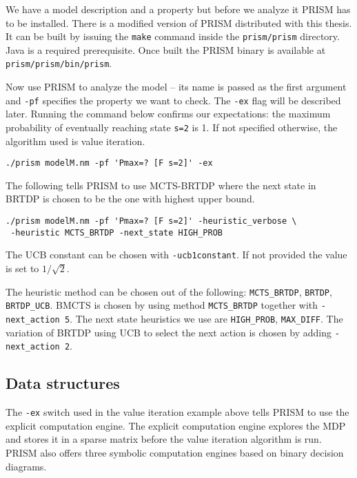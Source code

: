 We have a model description and a property but before we analyze it
PRISM has to be installed.
There is a modified version of PRISM distributed with this thesis. It
can be built by issuing the \verb|make| command inside the
\verb|prism/prism| directory. Java is a required prerequisite.
Once built the PRISM binary is available at \verb|prism/prism/bin/prism|.

Now use PRISM to analyze the model -- its name is passed as the first
argument and \verb|-pf| specifies the property we want to check.
The \verb|-ex| flag will be described later.
Running the command below
confirms our expectations: the maximum probability of eventually
reaching state \verb|s=2| is 1. If not specified otherwise, the
algorithm used is value iteration.

\medskip
\begin{verbatim}
./prism modelM.nm -pf 'Pmax=? [F s=2]' -ex
\end{verbatim}
\medskip

The following tells PRISM to use MCTS-BRTDP where the next state in
BRTDP is chosen to be the one with highest upper bound.

\medskip
\begin{verbatim}
./prism modelM.nm -pf 'Pmax=? [F s=2]' -heuristic_verbose \
 -heuristic MCTS_BRTDP -next_state HIGH_PROB
\end{verbatim}
\medskip

The UCB constant can be chosen with
\verb|-ucb1constant|. If not provided the value is set to
$1/\sqrt{2}$.

The heuristic method can be chosen out of the following:\linebreak
\verb|MCTS_BRTDP|, \verb|BRTDP|, \verb|BRTDP_UCB|. BMCTS is chosen by
using method \verb|MCTS_BRTDP| together with \verb|-next_action 5|.
The next state heuristics we use are
\verb|HIGH_PROB|, \verb|MAX_DIFF|.
The variation of BRTDP using UCB to select the next action is chosen by
adding \verb|-next_action 2|.

\subsection*{Data structures}
The \verb|-ex| switch used in the value iteration example above tells
PRISM to use the explicit computation engine.
The explicit computation engine explores the MDP and stores it in
a sparse matrix before the value iteration algorithm is run.
PRISM also offers three symbolic computation engines based on binary decision
diagrams.

